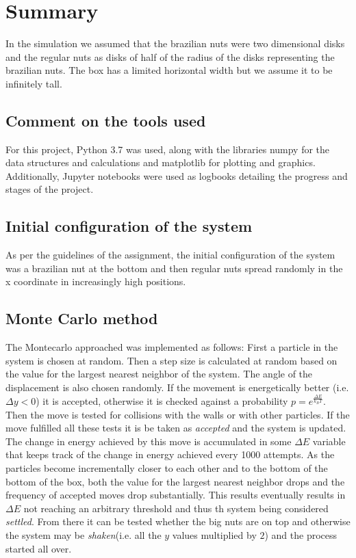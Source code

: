 \documentclass[12pt]{article}
\begin{document}
\section{Summary} %
In the simulation we assumed that the brazilian nuts were two dimensional disks and the regular nuts as disks of half of the radius of the disks representing the brazilian nuts. The box has a limited horizontal width but we assume it to be infinitely tall.

\subsection{Comment on the tools used}
For this project, Python 3.7 was used, along with the libraries numpy for the data structures and calculations and matplotlib for plotting and graphics. Additionally, Jupyter notebooks were used as logbooks detailing the progress and stages of the project.

\subsection{Initial configuration of the system}
As per the guidelines of the assignment, the initial configuration of the system was a brazilian nut at the bottom and then regular nuts spread randomly in the x coordinate in increasingly high positions. 

\subsection{Monte Carlo method}
The Montecarlo approached was implemented as follows: First a particle in the system is chosen at random. Then a step size is calculated at random based on the value for the largest nearest neighbor of the system. The angle of the displacement is also chosen randomly. If the movement is energetically better (i.e. $\Delta y < 0$) it is accepted, otherwise it is checked against a probability $ p = e^{\frac{\Delta E}{k_B T}} $. Then the move is tested for collisions with the walls or with other particles. If the move fulfilled all these tests it is be taken as \textit{accepted} and the system is updated. The change in energy achieved by this move is accumulated in some $\Delta E$ variable that keeps track of the change in energy achieved every 1000 attempts. As the particles become incrementally closer to each other and to the bottom of the bottom of the box, both the value for the largest nearest neighbor drops and the frequency of accepted moves drop substantially. This results eventually results in $\Delta E$ not reaching an arbitrary threshold and thus th system being considered \textit{settled}. From there it can be tested whether the big nuts are on top and otherwise the system may be \textit{shaken}(i.e. all the $y$ values multiplied by $2$) and the process started all over. 
\end{document}
